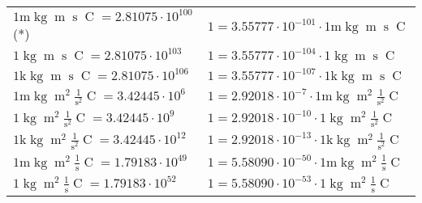 \begin{center}
\begin{longtable}{l l}
{\color{gray}$1 \bm{\mathrm{ m}}\operatorname{kg}{\operatorname{m}}{\operatorname{s}}{\operatorname{C}}{} = 2.81075\cdot10^{100} $}\quad(*) & {\color{gray}$ 1 = 3.55777\cdot10^{-101} \cdot 1 \bm{\mathrm{ m}}\operatorname{kg}{\operatorname{m}}{\operatorname{s}}{\operatorname{C}}{}$}  \\
{\color{black}$1 \bm{\mathrm{ }}\operatorname{kg}{\operatorname{m}}{\operatorname{s}}{\operatorname{C}}{} = 2.81075\cdot10^{103} $}   & {\color{black}$ 1 = 3.55777\cdot10^{-104} \cdot 1 \bm{\mathrm{ }}\operatorname{kg}{\operatorname{m}}{\operatorname{s}}{\operatorname{C}}{}$}  \\
{\color{gray}$1 \bm{\mathrm{ k}}\operatorname{kg}{\operatorname{m}}{\operatorname{s}}{\operatorname{C}}{} = 2.81075\cdot10^{106} $}   & {\color{gray}$ 1 = 3.55777\cdot10^{-107} \cdot 1 \bm{\mathrm{ k}}\operatorname{kg}{\operatorname{m}}{\operatorname{s}}{\operatorname{C}}{}$}  \\
{\color{gray}$1 \bm{\mathrm{ m}}\operatorname{kg}{\operatorname{m}^2}\frac1{\operatorname{s}^2}{\operatorname{C}}{} = 3.42445\cdot10^{6} $}   & {\color{gray}$ 1 = 2.92018\cdot10^{-7} \cdot 1 \bm{\mathrm{ m}}\operatorname{kg}{\operatorname{m}^2}\frac1{\operatorname{s}^2}{\operatorname{C}}{}$}  \\
{\color{black}$1 \bm{\mathrm{ }}\operatorname{kg}{\operatorname{m}^2}\frac1{\operatorname{s}^2}{\operatorname{C}}{} = 3.42445\cdot10^{9} $}   & {\color{black}$ 1 = 2.92018\cdot10^{-10} \cdot 1 \bm{\mathrm{ }}\operatorname{kg}{\operatorname{m}^2}\frac1{\operatorname{s}^2}{\operatorname{C}}{}$}  \\
{\color{gray}$1 \bm{\mathrm{ k}}\operatorname{kg}{\operatorname{m}^2}\frac1{\operatorname{s}^2}{\operatorname{C}}{} = 3.42445\cdot10^{12} $}   & {\color{gray}$ 1 = 2.92018\cdot10^{-13} \cdot 1 \bm{\mathrm{ k}}\operatorname{kg}{\operatorname{m}^2}\frac1{\operatorname{s}^2}{\operatorname{C}}{}$}  \\
{\color{gray}$1 \bm{\mathrm{ m}}\operatorname{kg}{\operatorname{m}^2}\frac1{\operatorname{s}}{\operatorname{C}}{} = 1.79183\cdot10^{49} $}   & {\color{gray}$ 1 = 5.58090\cdot10^{-50} \cdot 1 \bm{\mathrm{ m}}\operatorname{kg}{\operatorname{m}^2}\frac1{\operatorname{s}}{\operatorname{C}}{}$}  \\
{\color{black}$1 \bm{\mathrm{ }}\operatorname{kg}{\operatorname{m}^2}\frac1{\operatorname{s}}{\operatorname{C}}{} = 1.79183\cdot10^{52} $}   & {\color{black}$ 1 = 5.58090\cdot10^{-53} \cdot 1 \bm{\mathrm{ }}\operatorname{kg}{\operatorname{m}^2}\frac1{\operatorname{s}}{\operatorname{C}}{}$}  \\

\end{longtable}
\end{center}
